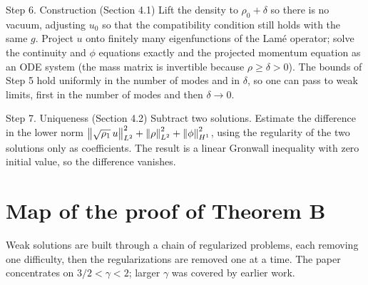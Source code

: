 \begin{step}{\routine{}Step 6. Construction (Section 4.1)}
Lift the density to $\rho_0 + \delta$ so there is no vacuum, adjusting $u_0$ so that the compatibility condition still holds with the same $g$. Project $u$ onto finitely many eigenfunctions of the Lamé operator; solve the continuity and $\phi$ equations exactly and the projected momentum equation as an ODE system (the mass matrix is invertible because $\rho \ge \delta > 0$). The bounds of Step 5 hold uniformly in the number of modes and in $\delta$, so one can pass to weak limits, first in the number of modes and then $\delta \to 0$.

\end{step}

\begin{step}{\routine{}Step 7. Uniqueness (Section 4.2)}
Subtract two solutions. Estimate the difference in the lower norm $\left\lVert \sqrt{\rho_1}\,u\right\rVert_{L^2}^2 + \left\lVert \rho\right\rVert_{L^2}^2 + \left\lVert \phi\right\rVert_{H^1}^2$, using the regularity of the two solutions only as coefficients. The result is a linear Gronwall inequality with zero initial value, so the difference vanishes.

\end{step}

\section{Map of the proof of Theorem B}

Weak solutions are built through a chain of regularized problems, each removing one difficulty, then the regularizations are removed one at a time. The paper concentrates on $3/2 < \gamma < 2$; larger $\gamma$ was covered by earlier work.

